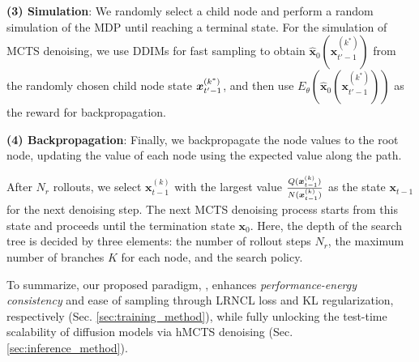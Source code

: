 \textbf{(3) Simulation}: We randomly select a child node and perform a random simulation of the MDP until reaching a terminal state. For the simulation of MCTS denoising, we use DDIMs \cite{song2020denoising} for fast sampling to obtain \( \hat{\boldsymbol{x}}_0(\boldsymbol{x}_{t'-1}^{(k^*)}) \) from the randomly chosen child node state ${\boldsymbol{x}}_{t'-1}^{(k^*)}$, and then use \( E_\theta(\hat{\boldsymbol{x}}_0(\boldsymbol{x}_{t'-1}^{(k^*)})) \) as the reward for backpropagation.

\textbf{(4) Backpropagation}: Finally, we backpropagate the node values to the root node, updating the value of each node using the expected value along the path.
 
 After $N_r$  rollouts, we select \( \boldsymbol{x}_{t-1}^{(k)} \) with the largest value $\frac{Q({\boldsymbol{x}}_{t-1}^{(k)})}{N({\boldsymbol{x}}_{t-1}^{(k)})}$ as the state \( \boldsymbol{x}_{t-1} \) for the next denoising step. The next MCTS denoising process starts from this state and proceeds until the termination state $\boldsymbol{x}_0$. Here, the depth of the search tree is decided by three elements: the number of rollout steps $N_r$, the maximum number of branches $K$ for each node, and the search policy.

To summarize, our proposed paradigm, \proj, enhances \emph{performance-energy consistency} and ease of sampling through LRNCL loss and KL regularization, respectively (Sec. \ref{sec:training_method}), while fully unlocking the test-time scalability of diffusion models via hMCTS denoising (Sec. \ref{sec:inference_method}).